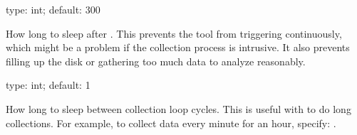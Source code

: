 \documentclass[letterpaper,10pt,english]{sphinxmanual}
\begin{document}
\begin{fulllineitems}
\label{\detokenize{mariadb-stat:cmdoption-mariadb-stat-sleep}}
type: int; default: 300

How long to sleep after {\hyperref[\detokenize{mariadb-stat:cmdoption-mariadb-stat-collect}]{}}.  This prevents the tool
from triggering continuously, which might be a problem if the collection process is intrusive.
It also prevents filling up the disk or gathering too much data to analyze
reasonably.

\end{fulllineitems}


\begin{fulllineitems}
\label{\detokenize{mariadb-stat:cmdoption-mariadb-stat-sleep-collect}}
type: int; default: 1

How long to sleep between collection loop cycles.  This is useful with
 to do long collections.  For example, to collect data every
minute for an hour, specify: .

\end{fulllineitems}

\end{document}

